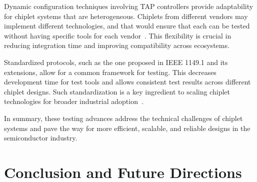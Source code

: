 \documentclass[acmtog, 12pt]{acmart}
\begin{document}
Dynamic configuration techniques involving TAP controllers provide adaptability for chiplet systems that are heterogeneous. Chiplets from different vendors may implement different technologies, and that would ensure that each can be tested without having specific tools for each vendor~\cite{9824550}. This flexibility is crucial in reducing integration time and improving compatibility across ecosystems.

Standardized protocols, such as the one proposed in IEEE 1149.1 and its extensions, allow for a common framework for testing. This decreases development time for test tools and allows consistent test results across different chiplet designs. Such standardization is a key ingredient to scaling chiplet technologies for broader industrial adoption~\cite{6515989}.

In summary, these testing advances address the technical challenges of chiplet systems and pave the way for more efficient, scalable, and reliable designs in the semiconductor industry.



\section*{Conclusion and Future Directions}



\end{document}
